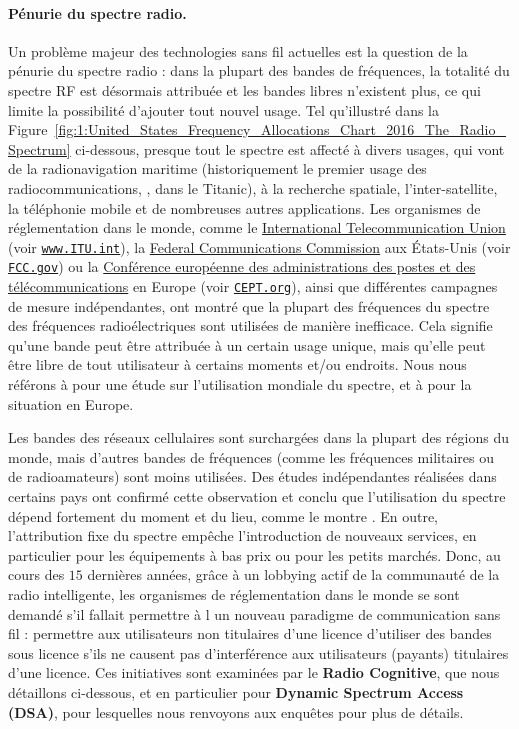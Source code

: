 \begin{resume_fr}
\paragraph{Pénurie du spectre radio.}
%
Un problème majeur des technologies sans fil actuelles est la question de la pénurie du spectre radio :
dans la plupart des bandes de fréquences, la totalité du spectre RF est désormais attribuée et les bandes libres n'existent plus, ce qui limite la possibilité d'ajouter tout nouvel usage.
Tel qu'illustré dans la Figure~\ref{fig:1:United_States_Frequency_Allocations_Chart_2016_The_Radio_Spectrum} ci-dessous,
presque tout le spectre
est affecté à divers usages, qui vont de la radionavigation maritime (historiquement le premier usage des radiocommunications, \eg, dans le Titanic), à la recherche spatiale, l'inter-satellite, la téléphonie mobile et de nombreuses autres applications.
%
Les organismes de réglementation dans le monde, comme le
\href{https://www.itu.int/en/Pages/default.aspx}{International Telecommunication Union} (voir \href{https://www.itu.int/}{\texttt{www.ITU.int}}),
la \href{https://www.fcc.gov/}{Federal Communications Commission} aux États-Unis (voir \href{https://www.fcc.gov/}{\texttt{FCC.gov}})
ou la \href{https://cept.org}{ Conférence européenne des administrations des postes et des télécommunications} en Europe (voir \href{https://www.CEPT.org/}{\texttt{CEPT.org}}),
ainsi que différentes campagnes de mesure indépendantes, ont montré que la plupart des fréquences du spectre des fréquences radioélectriques sont utilisées de manière inefficace.
Cela signifie qu'une bande peut être attribuée à un certain usage unique, mais qu'elle peut être libre de tout utilisateur à certains moments et/ou endroits.
Nous nous référons à \cite{patil2011survey} pour une étude sur l'utilisation mondiale du spectre, et à \cite{valenta2010survey} pour la situation en Europe.


Les bandes des réseaux cellulaires sont surchargées dans la plupart des régions du monde, mais d'autres bandes de fréquences (comme les fréquences militaires ou de radioamateurs) sont moins utilisées.
Des études indépendantes réalisées dans certains pays ont confirmé cette observation et conclu que l'utilisation du spectre dépend fortement du moment et du lieu, comme le montre \cite{Lopez2009spectral}.
En outre, l'attribution fixe du spectre empêche
l'introduction de nouveaux services, en particulier pour les équipements à bas prix ou pour les petits marchés.
%
Donc, au cours des $15$ dernières années, grâce à un lobbying actif de la communauté de la radio intelligente,
les organismes de réglementation dans le monde se sont demandé s'il fallait permettre à l
un nouveau paradigme de communication sans fil :
permettre aux utilisateurs non titulaires d'une licence d'utiliser des bandes sous licence s'ils ne causent pas d'interférence aux utilisateurs (payants) titulaires d'une licence.
Ces initiatives sont examinées par le \textbf{Radio Cognitive},
que nous détaillons ci-dessous, et en particulier pour \textbf{Dynamic Spectrum Access (DSA)},
pour lesquelles nous renvoyons aux enquêtes \cite{akyildiz2006next,garhwal2012survey} pour plus de détails.




\end{resume_fr}
